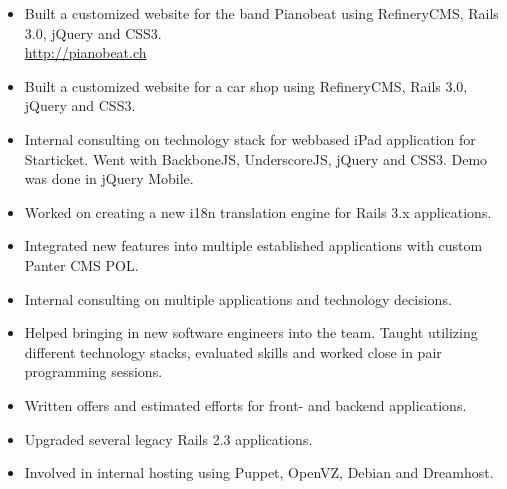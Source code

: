 \documentclass[10pt,a4paper]{moderncv}
\begin{document}
{\begin{itemize}
  \item Built a customized website for the band Pianobeat using RefineryCMS, Rails 3.0,
    jQuery and CSS3.\\
        \url{http://pianobeat.ch}
  \item Built a customized website for a car shop using RefineryCMS, Rails 3.0,
    jQuery and CSS3.
  \item Internal consulting on technology stack for webbased iPad application
    for Starticket. Went with BackboneJS, UnderscoreJS, jQuery and CSS3. Demo
    was done in jQuery Mobile.
  \item Worked on creating a new i18n translation engine for Rails 3.x
    applications.
  \item Integrated new features into multiple established applications with custom
    Panter CMS POL.
  \item Internal consulting on multiple applications and technology decisions.
  \item Helped bringing in new software engineers into the team. Taught
    utilizing different technology stacks, evaluated skills and worked close in
    pair programming sessions.
  \item Written offers and estimated efforts for front- and backend applications.
  \item Upgraded several legacy Rails 2.3 applications.
  \item Involved in internal hosting using Puppet, OpenVZ, Debian and Dreamhost.
\end{itemize}}
\end{document}
